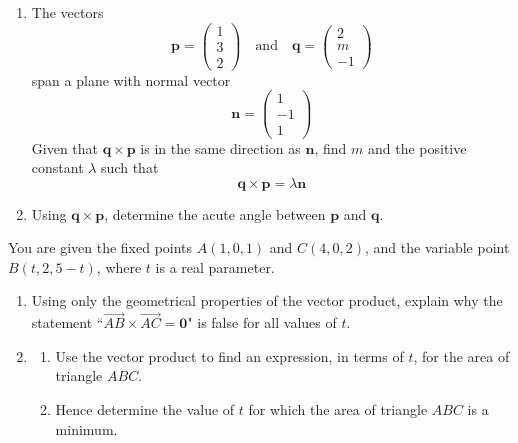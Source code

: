 \documentclass[leqno]{article}
\begin{document}
\djsFrontMatter
\begin{enumerate}[
  label=\textbf{\arabic*.},
  leftmargin=*,
  topsep=0pt,
  partopsep=0pt,
  parsep=0pt
]


\questionitem

\begin{enumerate}[label=\textbf{(\alph*)}]
  \item The vectors
  \[
  \mathbf{p}=\begin{pmatrix}1\\3\\2\end{pmatrix}
  \quad\text{and}\quad
  \mathbf{q}=\begin{pmatrix}2\\m\\-1\end{pmatrix}
  \]
  span a plane with normal vector
  \[
  \mathbf{n}=\begin{pmatrix}1\\-1\\1\end{pmatrix}
  \]
  Given that $\mathbf{q}\times\mathbf{p}$ is in the same direction as $\mathbf{n}$, find $m$ and the positive constant $\lambda$ such that
  \[
  \mathbf{q}\times\mathbf{p}=\lambda\mathbf{n}
  \]
  \item Using $\mathbf{q}\times\mathbf{p}$, determine the acute angle between $\mathbf{p}$ and $\mathbf{q}$.  \\
\end{enumerate}

\newpage

\questionitem

You are given the fixed points $A(1,0,1)$ and $C(4,0,2)$, and the variable point $B(t,2,5-t)$, where $t$ is a real parameter. \\

\begin{enumerate}[label=\textbf{(\alph*)}]
  \item Using only the geometrical properties of the vector product, explain why the statement ``$\overrightarrow{AB} \times \overrightarrow{AC} = \mathbf{0}$" is false for all values of $t$.  \\
  \item
  \begin{enumerate}[label=(\roman*)]
    \item Use the vector product to find an expression, in terms of $t$, for the area of triangle $ABC$. 
    \item Hence determine the value of $t$ for which the area of triangle $ABC$ is a minimum.  \\
  \end{enumerate}
\end{enumerate}


\end{enumerate}
\end{document}
